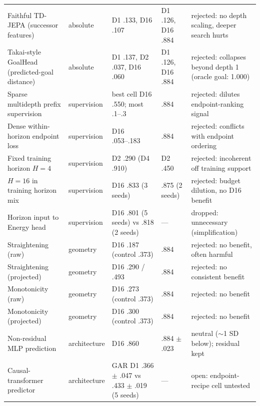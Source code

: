 \begin{table}[t]
\begin{tabular}{@{}llllp{4.6cm}@{}}
Faithful TD-JEPA (successor features) & absolute & D1 .133, D16 .107 & D1 .126, D16 .884 & rejected: no depth scaling, deeper search hurts \\
Takai-style GoalHead (predicted-goal distance) & absolute & D1 .137, D2 .037, D16 .060 & D1 .126, D16 .884 & rejected: collapses beyond depth 1 (oracle goal: 1.000) \\
\midrule
Sparse multidepth prefix supervision & supervision & best cell D16 .550; most .1--.3 & .884 & rejected: dilutes endpoint-ranking signal \\
Dense within-horizon endpoint loss & supervision & D16 .053--.183 & .884 & rejected: conflicts with endpoint ordering \\
Fixed training horizon $H{=}4$ & supervision & D2 .290 (D4 .910) & D2 .450 & rejected: incoherent off training support \\
$H{=}16$ in training horizon mix & supervision & D16 .833 (3 seeds) & .875 (2 seeds) & rejected: budget dilution, no D16 benefit \\
Horizon input to Energy head & supervision & D16 .801 (5 seeds) vs .818 (2 seeds) & --- & dropped: unnecessary (simplification) \\
\midrule
Straightening (raw) & geometry & D16 .187 (control .373) & .884 & rejected: no benefit, often harmful \\
Straightening (projected) & geometry & D16 .290 / .493 & .884 & rejected: no consistent benefit \\
Monotonicity (raw) & geometry & D16 .273 (control .373) & .884 & rejected: no benefit \\
Monotonicity (projected) & geometry & D16 .300 (control .373) & .884 & rejected: no benefit \\
\midrule
Non-residual MLP prediction & architecture & D16 .860 & .884 $\pm$ .023 & neutral ($\sim$1 SD below); residual kept \\
Causal-transformer predictor & architecture & GAR D1 .366 $\pm$ .047 vs .433 $\pm$ .019 (5 seeds) & --- & open: endpoint-recipe cell untested \\
\bottomrule
\end{tabular}
\end{table}
